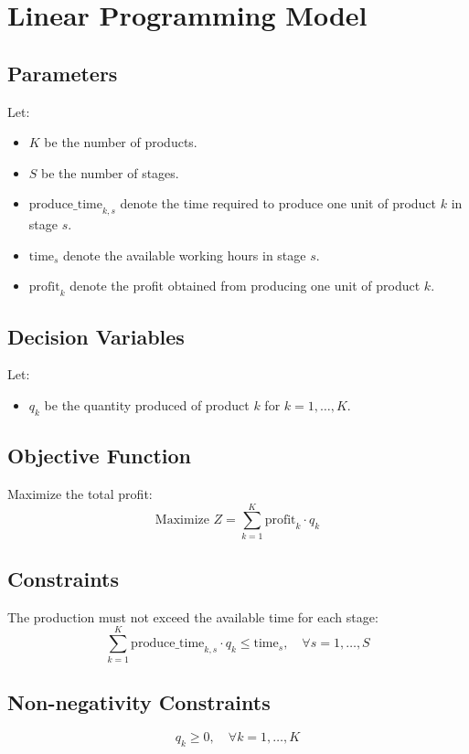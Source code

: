 \documentclass{article}
\begin{document}
\section*{Linear Programming Model}

\subsection*{Parameters}
Let:
\begin{itemize}
    \item \( K \) be the number of products.
    \item \( S \) be the number of stages.
    \item \( \text{produce\_time}_{k, s} \) denote the time required to produce one unit of product \( k \) in stage \( s \).
    \item \( \text{time}_{s} \) denote the available working hours in stage \( s \).
    \item \( \text{profit}_{k} \) denote the profit obtained from producing one unit of product \( k \).
\end{itemize}

\subsection*{Decision Variables}
Let:
\begin{itemize}
    \item \( q_k \) be the quantity produced of product \( k \) for \( k = 1, \ldots, K \).
\end{itemize}

\subsection*{Objective Function}
Maximize the total profit:
\[
\text{Maximize } Z = \sum_{k=1}^{K} \text{profit}_{k} \cdot q_k
\]

\subsection*{Constraints}
The production must not exceed the available time for each stage:
\[
\sum_{k=1}^{K} \text{produce\_time}_{k, s} \cdot q_k \leq \text{time}_{s}, \quad \forall s = 1, \ldots, S
\]

\subsection*{Non-negativity Constraints}
\[
q_k \geq 0, \quad \forall k = 1, \ldots, K
\]
\end{document}

